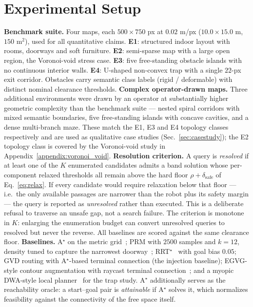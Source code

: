 \documentclass[conference]{IEEEtran}
\begin{document}
\section{Experimental Setup}
\label{sec:setup}
\textbf{Benchmark suite.} Four maps, each $500\times750$ px at $0.02$ m/px ($10.0\times15.0$ m, $150$ m$^2$), used for all quantitative claims. \textbf{E1}: structured indoor layout with rooms, doorways and soft furniture. \textbf{E2}: semi-sparse map with a large open region, the Voronoi-void stress case. \textbf{E3}: five free-standing obstacle islands with no continuous interior walls. \textbf{E4}: U-shaped non-convex trap with a single $22$-px exit corridor. Obstacles carry semantic class labels (rigid / deformable) with distinct nominal clearance thresholds.
\textbf{Complex operator-drawn maps.} Three additional environments were drawn by an operator at substantially higher geometric complexity than the benchmark suite --- nested spiral corridors with mixed semantic boundaries, five free-standing islands with concave cavities, and a dense multi-branch maze. These match the E1, E3 and E4 topology classes respectively and are used as qualitative case studies (Sec.~\ref{sec:casestudy}); the E2 topology class is covered by the Voronoi-void study in Appendix~\ref{appendix:voronoi_void}.
\textbf{Resolution criterion.} A query is \emph{resolved} if at least one of the $K$ enumerated candidates admits a band solution whose per-component relaxed thresholds all remain above the hard floor $\rho+\delta_{\mathrm{safe}}$ of Eq.~\eqref{eq:relax}. If every candidate would require relaxation below that floor --- i.e.\ the only available passages are narrower than the robot plus its safety margin --- the query is reported as \emph{unresolved} rather than executed. This is a deliberate refusal to traverse an unsafe gap, not a search failure. The criterion is monotone in $K$: enlarging the enumeration budget can convert unresolved queries to resolved but never the reverse. All baselines are scored against the same clearance floor.
\textbf{Baselines.} A$^\star$ on the metric grid~\cite{hart1968}; PRM with $2500$ samples and $k=12$, density tuned to capture the narrowest doorway~\cite{kavraki1996}; RRT$^\star$~\cite{karaman2011} with goal bias $0.05$; GVD routing with A$^\star$-based terminal connection (the injection baseline); EGVG-style contour augmentation with raycast terminal connection~\cite{qi2025egvg}; and a myopic DWA-style local planner~\cite{fox1997} for the trap study. A$^\star$ additionally serves as the reachability oracle: a start--goal pair is \emph{attainable} if A$^\star$ solves it, which normalizes feasibility against the connectivity of the free space itself.
\end{document}
